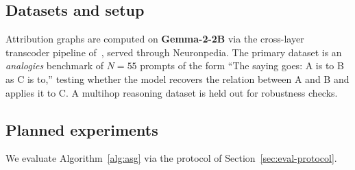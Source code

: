 \subsection{Datasets and setup}

Attribution graphs are computed on \textbf{Gemma-2-2B} via the
cross-layer transcoder pipeline of~\cite{ameisen2024scaling}, served
through Neuronpedia. The primary dataset is an \emph{analogies}
benchmark of $N = 55$ prompts of the form ``The saying goes: A is
to B as C is to,'' testing whether the model recovers the relation
between A and B and applies it to C. A multihop reasoning dataset is
held out for robustness checks.

\subsection{Planned experiments}

We evaluate Algorithm~\ref{alg:asg} via the protocol of
Section~\ref{sec:eval-protocol}.

